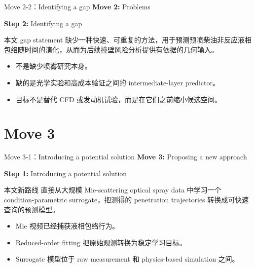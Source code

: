 \documentclass[aspectratio=169,11pt]{beamer}
\newcommand{\movetag}[2]{\textbf{Move #1:} #2}
\newcommand{\steptag}[2]{\textbf{Step #1:} #2}
\begin{document}
\begin{frame}{Move 2-2：Identifying a gap}
\small
\movetag{2}{Problems}

\vspace{0.5em}
\steptag{2}{Identifying a gap}

\vspace{0.8em}
\begin{block}{本文 gap statement}
缺少一种快速、可重复的方法，用于预测预喷柴油非反应液相包络随时间的演化，从而为后续撞壁风险分析提供有依据的几何输入。
\end{block}

\begin{itemize}
  \item 不是缺少喷雾研究本身。
  \item 缺的是光学实验和高成本验证之间的 intermediate-layer predictor。
  \item 目标不是替代 CFD 或发动机试验，而是在它们之前缩小候选空间。
\end{itemize}
\end{frame}

\section{Move 3}

\begin{frame}{Move 3-1：Introducing a potential solution}
\small
\movetag{3}{Proposing a new approach}

\vspace{0.5em}
\steptag{1}{Introducing a potential solution}

\vspace{0.8em}
\begin{block}{本文新路线}
直接从大规模 Mie-scattering optical spray data 中学习一个 condition-parametric surrogate，把测得的 penetration trajectories 转换成可快速查询的预测模型。
\end{block}

\begin{itemize}
  \item Mie 视频已经捕获液相包络行为。
  \item Reduced-order fitting 把原始观测转换为稳定学习目标。
  \item Surrogate 模型位于 raw measurement 和 physics-based simulation 之间。
\end{itemize}
\end{frame}
\end{document}
